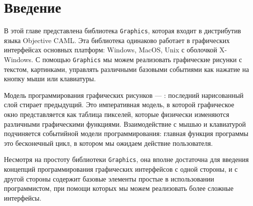 \section{Введение}
\label{sec:introduction_5}

В этой главе представлена библиотека \texttt{Graphics}, которая входит 
в дистрибутив языка Objective CAML. Эта библиотека одинаково работает в
графических интерфейсах основных платформ: Windows, MacOS, Unix с оболочкой
X-Windows. С помощью \texttt{Graphics} мы можем реализовать графические рисунки 
с текстом, картинками, управлять различными базовыми событиями как нажатие на
кнопку мыши или клавиатуры.

Модель программирования графических рисунков --- :
последний нарисованный слой стирает предыдущий. Это императивная модель, в 
которой графическое окно представляется как таблица пикселей, которые 
физически изменяются различными графическими функциями. Взаимодействие с мышью и
клавиатурой подчиняется событийной модели программирования: главная 
функция программы это бесконечный цикл, в котором мы ожидаем действие 
пользователя.

Несмотря на простоту библиотеки \texttt{Graphics}, она вполне достаточна для 
введения концепций программирования графических интерфейсов с одной стороны, и 
с другой стороны содержит базовые элементы простые в использовании 
программистом, при помощи которых мы можем реализовать более сложные интерфейсы.